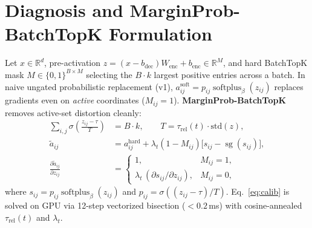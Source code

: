 \documentclass[10pt]{article}
\begin{document}
\section{Diagnosis and MarginProb-BatchTopK Formulation}
Let $x \in \mathbb{R}^d$, pre-activation $z = (x - b_{\mathrm{dec}})W_{\mathrm{enc}} + b_{\mathrm{enc}} \in \mathbb{R}^M$, and hard BatchTopK mask $M \in \{0,1\}^{B\times M}$ selecting the $B\cdot k$ largest positive entries across a batch. In naive ungated probabilistic replacement (v1), $a_{ij}^{\mathrm{soft}} = p_{ij}\operatorname{softplus}_\beta(z_{ij})$ replaces gradients even on \emph{active} coordinates ($M_{ij}=1$). \textbf{MarginProb-BatchTopK} removes active-set distortion cleanly:
\begin{align}
  \sum_{i,j} \sigma\!\left(\frac{z_{ij} - \tau}{T}\right) &= B\cdot k, \qquad T = \tau_{\mathrm{rel}}(t)\cdot \mathrm{std}(z), \label{eq:calib} \\
  \tilde{a}_{ij} &= a_{ij}^{\mathrm{hard}} + \lambda_t (1 - M_{ij})\Big[s_{ij} - \operatorname{sg}(s_{ij})\Big], \label{eq:mp} \\
  \frac{\partial \tilde{a}_{ij}}{\partial z_{ij}} &= \begin{cases} 1, & M_{ij}=1, \\ \lambda_t\,(\partial s_{ij} / \partial z_{ij}), & M_{ij}=0, \end{cases} \label{eq:mp_grad}
\end{align}
where $s_{ij} = p_{ij}\operatorname{softplus}_\beta(z_{ij})$ and $p_{ij} = \sigma((z_{ij} - \tau)/T)$.
Eq.~\eqref{eq:calib} is solved on GPU via 12-step vectorized bisection ($<0.2$\,ms) with cosine-annealed $\tau_{\mathrm{rel}}(t)$ and $\lambda_t$.
\end{document}
